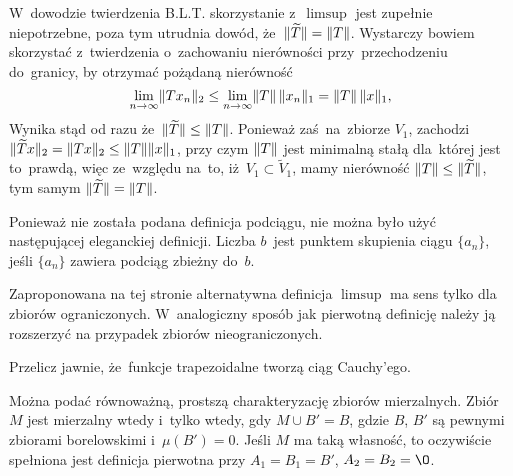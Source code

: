 \documentclass[a4paper,11pt]{article}
\begin{document}
\vspace{\spaceFour}



\start {} W~dowodzie twierdzenia B.L.T. skorzystanie z~$\limsup$
jest zupełnie niepotrzebne, poza tym utrudnia dowód,
że~$\Vert \widetilde{ T } \Vert = \lVert{  T  }\rVert$. Wystarczy bowiem skorzystać
z~twierdzenia o~zachowaniu nierówności przy~przechodzeniu do~granicy,
by otrzymać pożądaną nierówność
\begin{equation}
  \label{eq:RS-Vol-I-s01-13}
  \lim\limits_{ n \to \infty } \lVert{  T x_{ n }  }\rVert_{ 2 }
  \leq \lim\limits_{ n \to \infty } \lVert{  T  }\rVert \, \lVert{  x_{ n }  }\rVert_{ 1 }
  = \lVert{  T  }\rVert \, \lVert{  x  }\rVert_{ 1 },
\end{equation}
Wynika stąd od razu że~$\Vert \widetilde{ T } \Vert \leq \lVert{  T  }\rVert$. Ponieważ
zaś~na~zbiorze $V_{ 1 }$, zachodzi
$\Vert \widetilde{ T } x \Vert_{ 2 } = \lVert{  T x  }\rVert_{ 2 } \leq \lVert{  T  }\rVert \lVert{  x
 }\rVert_{ 1 }$, przy czym $\lVert{  T  }\rVert$ jest minimalną stałą dla~której jest
to~prawdą, więc ze~względu na~to, iż~$V_{ 1 } \subset \widetilde{ V }_{ 1 }$,
mamy nierówność $\lVert{  T  }\rVert \leq \Vert \widetilde{ T } \Vert$, tym samym
$\Vert \widetilde{ T } \Vert = \lVert{  T  }\rVert$. %

\vspace{\spaceFour}



\start {} Ponieważ nie została podana definicja podciągu, nie
można było użyć następującej eleganckiej definicji. Liczba $b$~jest
punktem skupienia ciągu $\{ a_{ n } \}$, jeśli $\{ a_{ n } \}$ zawiera
podciąg zbieżny do~$b$. %

\vspace{\spaceFour}



\start {} Zaproponowana na tej stronie alternatywna definicja
$\limsup$ ma sens tylko dla zbiorów ograniczonych. W~analogiczny
sposób jak pierwotną definicję należy ją rozszerzyć na przypadek
zbiorów nieograniczonych. %

\vspace{\spaceFour}



\start {} Przelicz jawnie, że~funkcje trapezoidalne tworzą ciąg
Cauchy'ego. \Dok

\vspace{\spaceFour}



\start {} Można podać równoważną, prostszą charakteryzację
zbiorów mierzalnych. Zbiór $M$ jest mierzalny wtedy i~tylko wtedy, gdy
$M \cup B' = B$, gdzie $B$, $B'$ są pewnymi zbiorami borelowskimi
i~$\mu( B' ) = 0$. Jeśli $M$ ma taką własność, to oczywiście spełniona
jest definicja pierwotna przy $A_{ 1 } = B_{ 1 } = B'$,
$A_{ 2 } = B_{ 2 } = \O$.
\end{document}
